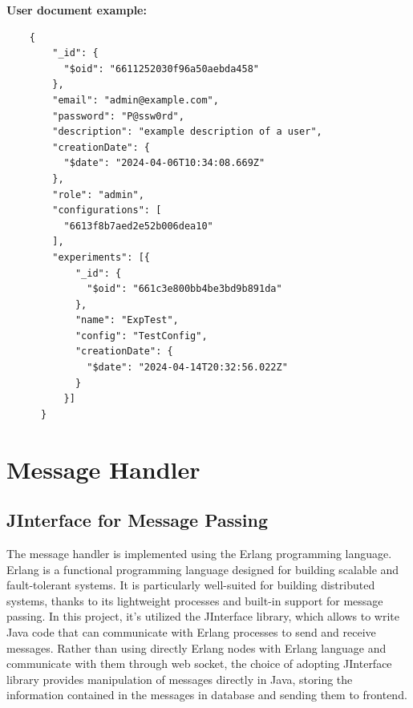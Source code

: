 \textbf{User document example:} \begin{verbatim}
    {
        "_id": {
          "$oid": "6611252030f96a50aebda458"
        },
        "email": "admin@example.com",
        "password": "P@ssw0rd",
        "description": "example description of a user",
        "creationDate": {
          "$date": "2024-04-06T10:34:08.669Z"
        },
        "role": "admin",
        "configurations": [
          "6613f8b7aed2e52b006dea10"
        ],
        "experiments": [{
            "_id": {
              "$oid": "661c3e800bb4be3bd9b891da"
            },
            "name": "ExpTest",
            "config": "TestConfig",
            "creationDate": {
              "$date": "2024-04-14T20:32:56.022Z"
            }
          }]
      }

    \end{verbatim}
\newpage
\section{Message Handler}

\subsection{JInterface for Message Passing}
The message handler is implemented using the Erlang programming language. Erlang is a functional
programming language designed for building scalable and fault-tolerant systems. It is
particularly well-suited for building distributed systems, thanks to its lightweight
processes and built-in support for message passing. In this project, it's utilized the 
JInterface library, which allows to write Java code that can communicate with Erlang 
processes to send and receive messages. Rather than using directly Erlang nodes with Erlang language and communicate with them
through web socket, the choice of adopting JInterface library provides manipulation of messages directly in 
Java, storing the information contained in the messages in database and sending them to frontend.

